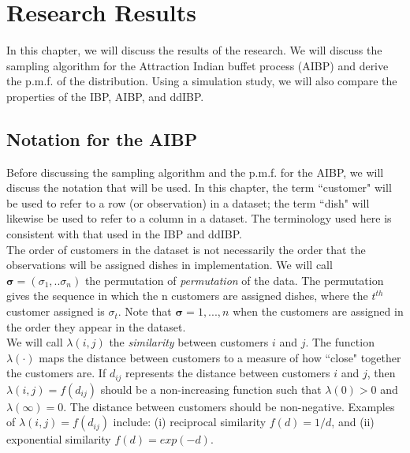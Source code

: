 \chapter{Research Results}
In this chapter, we will discuss the results of the research. We will discuss
the sampling algorithm for the Attraction Indian buffet process (AIBP) and
derive the p.m.f. of the distribution. Using a simulation study, we will also
compare the properties of the IBP, AIBP, and ddIBP.\\

\section{Notation for the AIBP}
Before discussing the sampling algorithm and the p.m.f. for the AIBP,  we will
discuss the notation that will be used. In this chapter, the term ``customer"
will be used to refer to a row (or observation) in a dataset; the term ``dish"
will likewise be used to refer to a column in a dataset. The terminology used
here is consistent with that used in the IBP and ddIBP.\\

\noindent
The order of customers in the dataset is not necessarily the order that the
observations will be assigned dishes in implementation. We will call $\bm
\sigma = (\sigma_1,..\sigma_n)$ the permutation of \textit{permutation} of the
data. The permutation gives the sequence in which the n customers are assigned
dishes, where the $t^{th}$ customer assigned is $\sigma_t$. Note that $\bm
\sigma = {1,...,n}$ when the customers are assigned in the order they appear
in the dataset.\\

\noindent
We will call $\lambda(i,j)$ the \textit{similarity} between customers $i$ and
$j$. The function $\lambda(\cdot)$ maps the distance between customers to a
measure of how ``close" together the customers are. If $d_{ij}$ represents the
distance between customers $i$ and $j$, then $\lambda(i,j)=f(d_{ij})$ should be
a non-increasing function such that $\lambda(0)>0$ and $\lambda(\infty)=0$. The
distance between customers should be non-negative. Examples of
$\lambda(i,j)=f(d_{ij})$ include: (i) reciprocal similarity $f(d) = 1/d$, and
(ii) exponential similarity $f(d) = exp(-d)$.\\


